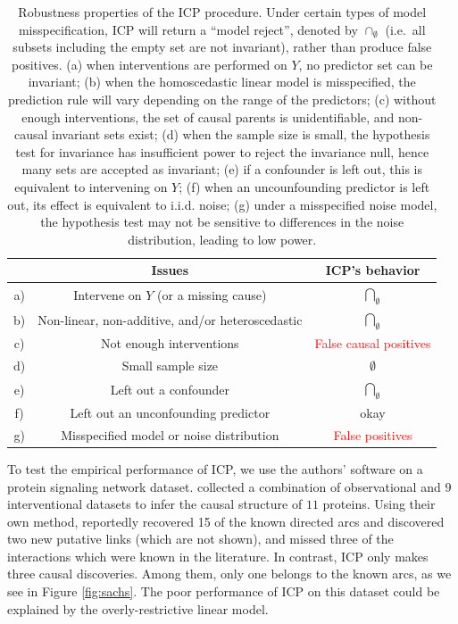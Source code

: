 \documentclass{article}
\begin{document}
\begin{table}[h]
\centering
  \begin{tabular}{c|c|c|}
    \hline
    &\textbf{Issues} & \textbf{ICP's behavior} \\
    \hline
    a) & Intervene on $Y$ (or a missing cause) &
    $\underset{\emptyset}{\bigcap}$ \\
    \hline
    b) & Non-linear, non-additive, and/or heteroscedastic &
    $\underset{\emptyset}{\bigcap}$ \\
    \hline
    c) & Not enough interventions &
    \textcolor{red}{False causal positives} \\
    \hline
    d) & Small sample size &
    $\emptyset$ \\
    \hline
    e) & Left out a confounder & $\underset{\emptyset}{\bigcap}$ \\
    \hline
    f) & Left out an unconfounding predictor & okay  \\
    \hline
    g) & Misspecified model or noise distribution & \textcolor{red}{False positives}\\\hline
  \end{tabular}
\caption{\small Robustness properties of the ICP procedure.  Under certain types
  of model misspecification, ICP will return a ``model reject'',
  denoted by $\cap_{\emptyset}$ (i.e.\ all subsets including the empty
  set are not invariant), rather than produce false positives.
(a) when interventions are performed on $Y$, no predictor set can be invariant;
(b) when the homoscedastic linear model is misspecified, the prediction rule
will vary depending on the range of the predictors; (c) without enough interventions,
the set of causal parents is unidentifiable, and non-causal invariant sets exist;
(d) when the sample size is small, the hypothesis test for invariance has insufficient power to reject the invariance null,
hence many sets are accepted as invariant;
(e) if a confounder is left out, this is equivalent to intervening on $Y$;
(f) when an uncounfounding predictor is left out, its effect is equivalent to i.i.d. noise;
(g) under a misspecified noise model, the hypothesis test may not be sensitive to differences in the noise distribution,
leading to low power.
}
\label{tab:icp}
\end{table}

To test the empirical performance of ICP, we use the authors' software
on a protein signaling network dataset. \citet{sachs2005causal}
collected a combination of observational and $9$ interventional datasets to
infer the causal structure of $11$ proteins.
Using their own method, \citet{sachs2005causal} reportedly recovered
15 of the known directed arcs and discovered two new putative links
(which are not shown), and missed three of the interactions which were known in the
literature. In contrast, ICP only makes three causal
discoveries. Among them, only one belongs to the known arcs, as we see in Figure \ref{fig:sachs}.
The poor performance of ICP on this dataset could be explained by the
overly-restrictive linear model.
\end{document}
